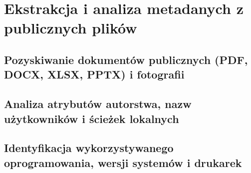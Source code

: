 \section{Ekstrakcja i analiza metadanych z publicznych plików}\label{sec:metadane}
\subsection{Pozyskiwanie dokumentów publicznych (PDF, DOCX, XLSX, PPTX) i fotografii}\label{subsec:pozyskiwanie-plikow}
\subsection{Analiza atrybutów autorstwa, nazw użytkowników i ścieżek lokalnych}\label{subsec:metadane-autorzy}
\subsection{Identyfikacja wykorzystywanego oprogramowania, wersji systemów i drukarek}\label{subsec:metadane-oprogramowanie}

